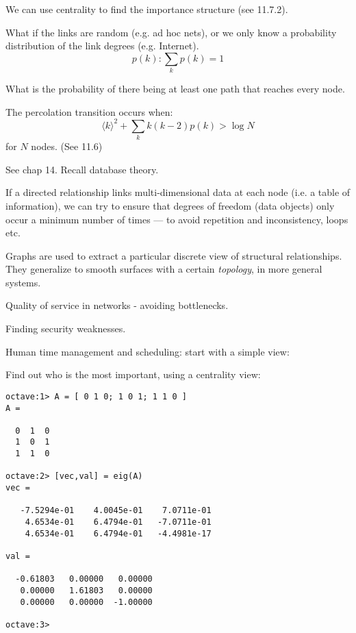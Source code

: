 \documentclass{slides}
\begin{document}
We can use centrality to find the importance structure (see 11.7.2).


What if the links are random (e.g. ad hoc nets), or we only know a probability distribution
of the link degrees (e.g. Internet). 
$$
p(k) : \sum_k p(k) = 1
$$

What is the probability of there being at least one path that reaches
every node. 

The percolation transition occurs when:
$$
\langle k\rangle^2 + \sum_k k(k-2) p(k) > \log N
$$
for $N$ nodes. (See 11.6)


See chap 14. Recall database theory.

If a directed relationship links multi-dimensional data at each node
(i.e. a table of information), we can try to ensure that degrees of
freedom (data objects) only occur a minimum number of times --- to
avoid repetition and inconsistency, loops etc.


Graphs are used to extract a particular discrete view of structural
relationships. They generalize to smooth surfaces with a certain
{\em topology}, in more general systems.


Quality of service in networks - avoiding bottlenecks.

Finding security weaknesses.

Human time management and scheduling: start with
a simple view:



Find out who is the most important, using
a centrality view:



\begin{verbatim}
octave:1> A = [ 0 1 0; 1 0 1; 1 1 0 ]
A =

  0  1  0
  1  0  1
  1  1  0

octave:2> [vec,val] = eig(A)
vec =

   -7.5294e-01    4.0045e-01    7.0711e-01
    4.6534e-01    6.4794e-01   -7.0711e-01
    4.6534e-01    6.4794e-01   -4.4981e-17

val =

  -0.61803   0.00000   0.00000
   0.00000   1.61803   0.00000
   0.00000   0.00000  -1.00000

octave:3>
\end{verbatim}
\end{document}
